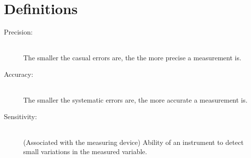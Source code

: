 \section{Definitions}

\begin{description}
	\item[Precision:] \hfill \\
The smaller the casual errors are, the the more precise a measurement is.

	\item[Accuracy:] \hfill \\
The smaller the systematic errors are, the more accurate a measurement is.

	\item[Sensitivity:] \hfill \\
(Associated with the measuring device) Ability of an instrument to detect small variations in the measured variable.
\end{description}
